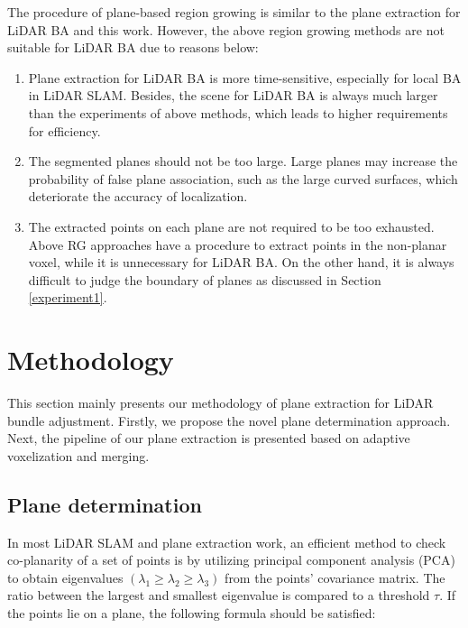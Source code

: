 \documentclass[letterpaper, 10 pt, conference]{ieeeconf}  %
\begin{document}
The procedure of plane-based region growing \cite{vo2015octree, araujo2020robust} is similar to the plane extraction for LiDAR BA \cite{liu2021balm} and this work. However, the above region growing methods are not suitable for LiDAR BA due to reasons below:

\begin{enumerate}
\item Plane extraction for LiDAR BA is more time-sensitive, especially for local BA in LiDAR SLAM. Besides, the scene for LiDAR BA is always much larger than the experiments of above methods, which leads to higher requirements for efficiency. 
\item The segmented planes should not be too large. Large planes may increase the probability of {false plane association}, such as the large curved surfaces, which deteriorate the accuracy of localization.
\item The extracted points on each plane are not required to be too exhausted. Above RG approaches \cite{vo2015octree, araujo2020robust} have a procedure to extract points in the non-planar voxel, while it is unnecessary for LiDAR BA. On the other hand, it is always difficult to judge the boundary of planes as discussed in Section \ref{experiment1}. 
\end{enumerate}


\section{Methodology} \label{methodology}

This section mainly presents our methodology of plane extraction for LiDAR bundle adjustment. Firstly, we propose the novel plane determination approach. Next, the pipeline of our plane extraction is presented based on adaptive voxelization and merging.

\subsection{Plane determination}

In most LiDAR SLAM and plane extraction work, an efficient method to check co-planarity of a set of points is by utilizing principal component analysis (PCA) to obtain eigenvalues $(\lambda_1 \ge \lambda_2 \ge \lambda_3)$ from the points' covariance matrix. The ratio between the largest and smallest eigenvalue is compared to a threshold $\tau$. If the points lie on a plane, the following formula should be satisfied:
\end{document}
